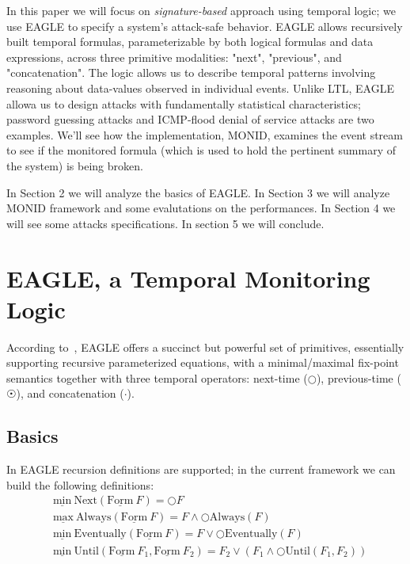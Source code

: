 \documentclass[english]{article}
\begin{document}
In this paper we will focus on \textit{signature-based} approach using temporal logic; we use EAGLE\cite{barringer2004rule,barringer2003eagle} to specify a system's attack-safe behavior. EAGLE allows recursively built temporal formulas, parameterizable by both logical formulas and data expressions, across three primitive modalities: "next", "previous", and "concatenation". The logic allows us to describe temporal patterns involving reasoning about data-values observed in individual events. Unlike LTL, EAGLE allowa us to design attacks with fundamentally statistical characteristics; password guessing attacks and ICMP-flood denial of service attacks are two examples. 
We'll see how the implementation, MONID, examines the event stream to see if the monitored formula (which is used to hold the pertinent summary of the system) is being broken.


In Section 2 we will analyze the basics of EAGLE. In Section 3 we will analyze MONID framework and some evalutations on the performances. In Section 4 we will see some attacks specifications. In section 5 we will conclude.

\section{EAGLE, a Temporal Monitoring Logic}
According to~\cite{barringer2004program}, EAGLE offers a succinct but powerful set of primitives, essentially supporting recursive parameterized equations, with a minimal/maximal fix-point semantics together with three temporal operators: next-time ($\bigcirc$), previous-time ($\astrosun$), and concatenation ($\cdot$).
\subsection{Basics}
In EAGLE recursion definitions are supported; in the current framework we can build the following definitions:
\begin{align*}
& \underline{\text{min}}\ \text{Next}(\underline{\text{Form}}\ F) = \bigcirc F \\
& \underline{\text{max}}\ \text{Always}(\underline{\text{Form}}\ F) = F \land \bigcirc \text{Always}(F) \\
& \underline{\text{min}}\ \text{Eventually}(\underline{\text{Form}}\ F) = F \lor \bigcirc \text{Eventually}(F) \\
& \underline{\text{min}}\ \text{Until}(\underline{\text{Form}}\ F_1, \underline{\text{Form}}\ F_2) = F_2 \lor (F_1 \land \bigcirc \text{Until}(F_1,F_2))
\end{align*}
\end{document}
